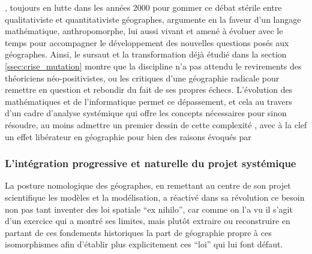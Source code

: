 \textcite{Sheppard2001}, toujours en lutte dans les années 2000 pour gommer ce débat stérile entre qualitativiste et quantitativiste géographes, argumente en la faveur d'un langage mathématique, anthropomorphe, lui aussi vivant et amené à évoluer avec le temps pour accompagner le développement des nouvelles questions posés aux géographes. Ainsi, le sursaut et la transformation déjà étudié dans la section \ref{ssec:crise_mutation} montre que la discipline n'a pas attendu le revirements des théoriciens néo-positivistes, ou les critiques d'une géographie radicale pour remettre en question et rebondir du fait de ses propres échecs. L'évolution des mathématiques et de l'informatique permet ce dépassement, et cela au travers d'un cadre d'analyse systémique qui offre les concepts nécessaires pour sinon résoudre, au moins admettre un premier dessin de cette complexité \autocite{Dauphine2003}, avec à la clef un effet libérateur en géographie pour bien des raisons évoqués par \textcite[27-28]{Pumain2003}



\subsubsection{L'intégration progressive et naturelle du projet systémique} 
\label{sssec:progressive_systemique}

La posture nomologique des géographes, en remettant au centre de son projet scientifique les modèles et la modélisation, a réactivé dans sa révolution ce besoin non pas tant inventer des loi spatiale \foreignquote{latin}{ex nihilo}, car comme on l'a vu il s'agit d'un exercice qui a montré ses limites, mais plutôt extraire ou reconstruire en partant de ces fondements historiques la part de géographie propre à ces isomorphismes afin d'établir plus explicitement ces \enquote{loi} qui lui font défaut.

